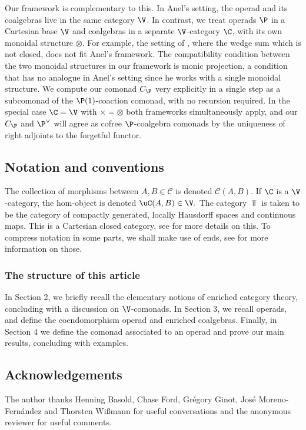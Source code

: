 \documentclass{tac}
\begin{document}
Our framework is complementary to this. In Anel's setting, the operad and its coalgebras live in the same category $\V$.
In contrast, we treat operads $\P$ in a Cartesian base $\V$ and coalgebras in a separate $\V$-category $\C$, with its own monoidal structure $\otimes$. For example, the setting of \cite{me1}, where the wedge sum which is not closed,
does not fit Anel's framework.
The compatibility condition between the two monoidal structures in our framework is monic projection, a condition that has no analogue in Anel's setting since he works with a
single monoidal structure. We compute our comonad $C_{\P}$ very explicitly in a single step as a subcomonad of the $\P(1)$-coaction comonad, with no recursion required. In the special case $\C = \V$ with $\times = \otimes$ both frameworks simultaneously apply, and our $C_{\P}$ and $\P^{\vee}$ will agree as cofree $\P$-coalgebra comonads by the uniqueness of right adjoints to the forgetful functor.

\subsection{Notation and conventions}
The collection of morphisms between $A,B \in \mathcal C$ is denoted $\mathcal C(A,B)$. If $\C$ is a $\V$-category, the hom-object is denoted  $\uC(A,B) \in \V.$ The category $\Top$ is taken to be the category of compactly generated, locally Hausdorff spaces and continuous maps. This is a Cartesian closed category, see \cite{steenrod67} for more details on this. To compress notation in some parts, we shall make use of ends, see \cite{loregian21} for more information on those. 
\subsubsection*{The structure of this article}
In Section 2, we briefly recall the elementary notions of enriched category theory, concluding with a discussion on $\V$-comonads. In Section 3, we recall operads, and define the coendomorphism operad and enriched coalgebras. Finally, in Section 4 we define the comonad associated to an operad and prove our main results, concluding with examples.

\subsection{Acknowledgements}
The author thanks Henning Basold, Chase Ford, Gr\'{e}gory Ginot, Jos\'{e} Moreno-Fern\'{a}ndez and Thorsten Wißmann for useful conversations and the anonymous reviewer for useful comments.
\end{document}
